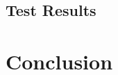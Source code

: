 \documentclass[acmtocl]{acmtrans2m}
\begin{document}
\subsection{Test Results}

\section{Conclusion}



\begin{thebibliography}{9}


\end{thebibliography} %
\end{document}

